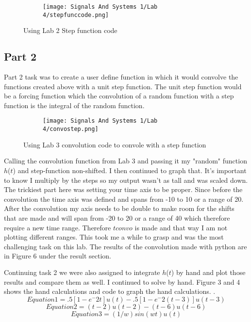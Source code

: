 \documentclass[12pt,a4paper]{article}
\begin{document}
\begin{figure}[h]
\begin{subfigure}{ 1\textwidth}
\texttt{[image: Signals And Systems 1/Lab 4/stepfunccode.png]}
\end{subfigure}
\caption{Using Lab 2 Step function code}
\label{fig:image2}
\end{figure}



\clearpage
\subsection{Part 2}
Part 2 task was to create a user define function in which it would convolve the functions created above with a unit step function. The unit step function would be a forcing function which the convolution of a random function with a step function is the integral of the random function.


\begin{figure}[h]
\begin{subfigure}{ 1\textwidth}
\texttt{[image: Signals And Systems 1/Lab 4/convostep.png]}
\end{subfigure}
\caption{Using Lab 3 convolution code to convole with a step function}
\label{fig:image2}
\end{figure}

Calling the convolution function from Lab 3 and passing it my "random" function $h$($t$) and step-function non-shifted. I then continued to graph that. It's important to know I multiply by the steps so my output wasn't as tall and was scaled down. The trickiest part here was setting your time axis to be proper. Since before the convolution the time axis was defined and spans from -10 to 10 or a range of 20. After the convolution my axis needs to be double to make room for the shifts that are made and will span from -20 to 20 or a range of 40 which therefore require a new time range. Therefore $tconvo$ is made and that way I am not plotting different ranges. This took me a while to grasp and was the most challenging task on this lab. The results of the convolution made with python are in Figure 6 under the result section.

\noindent Continuing task 2 we were also assigned to integrate $h$($t$) by hand and plot those results and compare them as well. I continued to  solve by hand. Figure 3 and 4 shows the hand calculations and code to graph the hand calculations.
. \[Equation 1 = .5[1-e^-2t]u(t)-.5[1-e^-2(t-3)]u(t-3)\] 
\[Equation 2 = (t-2)u(t-2)-(t-6)u(t-6)\] 
\[Equation 3 = (1/w)sin(wt)u(t)\] 
\end{document}
